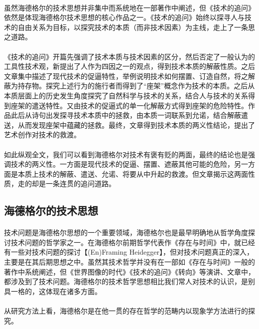 \documentclass{article}
\begin{document}
		\paragraph{}
		虽然海德格尔的技术思想并非集中而系统地在一部著作中阐述，但《技术的追问》依然是体现海德格尔技术思想的核心作品之一。《技术的追问》始终以探寻人与技术的自由关系为目标，以探究技术的本质（而非技术因素）为主线，走上了一条思之道路。
		\paragraph{}
		《技术的追问》开篇先强调了技术本质与技术因素的区分，然后否定了一般认为的工具性技术观，新提出了人作为四因之一的观点，得到技术本质的解蔽性质。之后文章集中描述了现代技术的促逼特性，举例说明技术如何摆置、订造自然，将之解蔽为持存物。探究上述行为的施行者而得到了“座架”概念作为技术的本质。之后从本质层面上的历史发生角度探究了自然科学与技术的关系，结合人与技术的关系得到座架的遣送特性。又由技术的促逼式的单一化解蔽方式得到座架的危险特性。作品此后从诗句出发探寻技术本质中的拯救，由本质一词联系到允诺，结合解蔽遣送，从而发现座架中蕴藏的拯救。最终，文章得到技术本质的两义性结论，提出了艺术创作对技术的救渡。
		\paragraph{}
		如此纵观全文，我们可以看到海德格尔对技术有褒有贬的两面，最终的结论也是强调技术的两义性。一方面是现代技术的促逼、摆置、遮蔽其他可能的危险，另一方面是本质上技术的解蔽、遣送、允诺、将要从中升起的救渡。但文章揭示这两面性质，走的却是一条连贯的追问道路。

	\subsection{海德格尔的技术思想}
		\paragraph{}
		技术问题是海德格尔思想的一个重要领域，海德格尔也是最早明确地从哲学角度探讨技术问题的哲学家之一。在海德格尔前期哲学代表作《存在与时间》中，就已经有一些对技术问题的探讨【(En)Framing Heidegger】，但对技术问题真正的深入，主要是在其后期思想之中。虽然其技术哲学并没有在一部如《存在与时间》一般的著作中系统阐述，但《世界图像的时代》《技术的追问》《转向》等演讲、文章中，都涉及到了技术问题。海德格尔的技术哲学思想相比我们常人对技术的认识，是别具一格的，这体现在诸多方面。
		\paragraph{}
		从研究方法上看，海德格尔是在他一贯的存在哲学的范畴内以现象学方法进行的探究。
\end{document}
